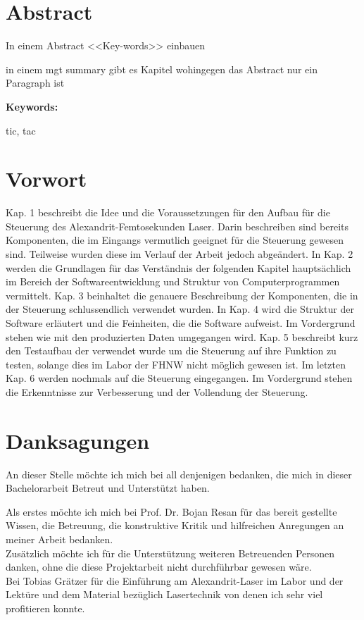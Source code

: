 \section*{Abstract}
In einem Abstract <<Key-words>> einbauen

in einem mgt summary gibt es Kapitel wohingegen das Abstract nur ein Paragraph ist

\vspace{2ex}

\textbf{Keywords:}

tic, tac

\clearpage
\section*{Vorwort}
Kap. 1 beschreibt die Idee und die Voraussetzungen für den Aufbau für die Steuerung des Alexandrit-Femtosekunden Laser. Darin beschreiben sind bereits Komponenten, die im Eingangs vermutlich geeignet für die Steuerung gewesen sind. Teilweise wurden diese im Verlauf der Arbeit jedoch abgeändert. In Kap. 2 werden die Grundlagen für das Verständnis der folgenden Kapitel hauptsächlich im Bereich der Softwareentwicklung und Struktur von Computerprogrammen vermittelt. Kap. 3 beinhaltet die genauere Beschreibung der Komponenten, die in der Steuerung schlussendlich verwendet wurden. In Kap. 4 wird die Struktur der Software erläutert und die Feinheiten, die die Software aufweist. Im Vordergrund stehen wie mit den produzierten Daten umgegangen wird. Kap. 5 beschreibt kurz den Testaufbau der verwendet wurde um die Steuerung auf ihre Funktion zu testen, solange dies im Labor der FHNW nicht möglich gewesen ist. Im letzten Kap. 6 werden nochmals auf die Steuerung eingegangen. Im Vordergrund stehen die Erkenntnisse zur Verbesserung und der Vollendung der Steuerung.

\section*{Danksagungen}
An dieser Stelle möchte ich mich bei all denjenigen bedanken, die mich in dieser Bachelorarbeit Betreut und Unterstützt haben.

Als erstes möchte ich mich bei Prof. Dr. Bojan Resan für das bereit gestellte Wissen, die Betreuung, die konstruktive Kritik und hilfreichen Anregungen an meiner Arbeit bedanken.\\

Zusätzlich möchte ich für die Unterstützung weiteren Betreuenden Personen danken, ohne die diese Projektarbeit nicht durchführbar gewesen wäre.\\ Bei Tobias Grätzer für die Einführung am Alexandrit-Laser im Labor und der Lektüre und dem Material bezüglich Lasertechnik von denen ich sehr viel profitieren konnte.

